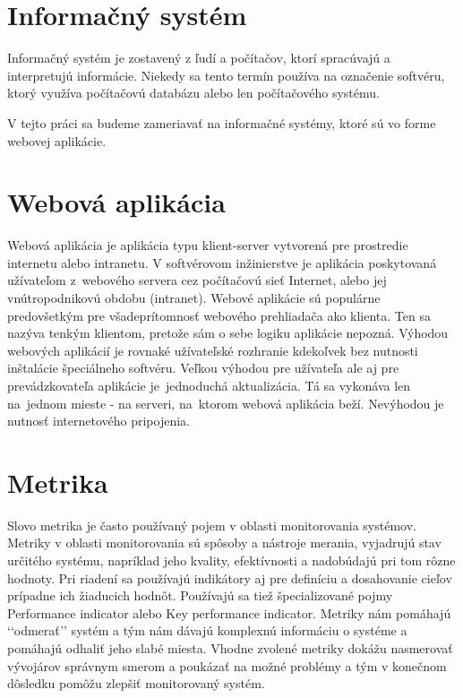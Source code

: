 \documentclass[a4paper, upjsfrontpage, thesismargins, thesislinespacing]{rnthesis}
\begin{document}
\section{Informačný systém}

Informačný systém je zostavený z ľudí a počítačov, ktorí spracúvajú a interpretujú informácie.
Niekedy sa tento termín používa na označenie softvéru, ktorý využíva počítačovú databázu alebo len počítačového systému.

V tejto práci sa budeme zameriavať na informačné systémy, ktoré sú vo forme webovej aplikácie.


\section{Webová aplikácia}

Webová aplikácia je aplikácia typu klient-server vytvorená pre prostredie internetu alebo intranetu.
V softvérovom inžinierstve je aplikácia poskytovaná užívateľom z~webového servera cez počítačovú sieť Internet, 
alebo jej vnútropodni\-kovú obdobu (intranet). 
Webové aplikácie sú populárne predovšetkým pre všade\-prítomnosť webového prehliadača ako klienta. 
Ten sa nazýva tenkým klientom, pretože sám o sebe logiku aplikácie nepozná.
Výhodou webových aplikácií je rovnaké užívateľské rozhranie kdekoľvek bez nutnosti inštalácie špeciálneho softvéru. 
Veľkou výhodou pre užívateľa ale aj pre prevádzkovateľa aplikácie je~jednoduchá aktualizácia. 
Tá sa vykonáva len na~jednom mieste - na serveri, na~ktorom webová aplikácia beží. Nevýhodou je nutnosť internetového pripojenia.

\section{Metrika}

Slovo metrika je často používaný pojem v oblasti monitorovania systémov.
Metri\-ky v oblasti monitorovania sú spôsoby a nástroje merania, vyjadrujú stav určitého systému, 
napríklad jeho kvality, efektívnosti a nadobúdajú pri tom rôzne hodnoty. 
Pri riadení sa používajú indikátory aj pre definíciu a dosahovanie cieľov prípadne ich žiaducich hodnôt. 
Používajú sa tiež špecializované pojmy Performance indicator alebo Key performance indicator.
Metriky nám pomáhajú ‘‘odmerať’’ systém a tým nám dávajú komplexnú informáciu o systéme a pomáhajú odhaliť jeho slabé miesta.
Vhodne zvolené metriky dokážu nasmerovať vývojárov správnym smerom a poukázať na možné problémy a tým v konečnom dôsledku pomôžu zlepšiť monitorovaný systém.
\end{document}
